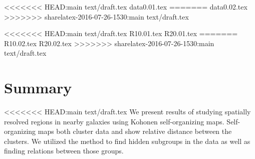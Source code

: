 \documentclass[useAMS,usenatbib]{mn2e}
\begin{document}

<<<<<<< HEAD:main text/draft.tex
{data0.01.tex}
=======
{data0.02.tex}
>>>>>>> sharelatex-2016-07-26-1530:main text/draft.tex

<<<<<<< HEAD:main text/draft.tex
{R10.01.tex}
{R20.01.tex}
=======
{R10.02.tex}
{R20.02.tex}
>>>>>>> sharelatex-2016-07-26-1530:main text/draft.tex

\section{Summary}
\label{sec: summary}

<<<<<<< HEAD:main text/draft.tex
We present results of studying spatially resolved regions in nearby galaxies using Kohonen self-organizing maps.
Self-organizing maps both cluster data and show relative distance between the clusters. 
We utilized the method to find hidden subgroups in the data as well as finding relations between those groups.
\end{document}
